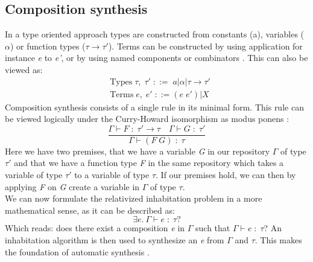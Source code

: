 \subsection{Composition synthesis}
In a type oriented approach types are constructed from constants (a), variables ($\alpha$) or function types ($\tau \to \tau'$). Terms can be constructed by using application for instance \textit{e} to \textit{e'}, or by using named components or combinators \cite{CLSPaper}. This can also be viewed as:
\begin{align*}
	&\text{Types}\; \tau,\;\tau'\; ::=\; a | \alpha | \tau \to \tau'\\
	&\text{Terms}\; e,\; e'\; ::= (e\; e') | X
\end{align*}
Composition synthesis consists of a single rule in its minimal form. This rule can be viewed logically under the Curry-Howard isomorphism as modus ponens \cite{CLSPaper}:
\begin{equation*}
	\frac{\Gamma \vdash F\; : \; \tau' \to \tau \quad \Gamma \vdash G\; : \; \tau'}{\Gamma \vdash (F\; G)\; : \; \tau}
\end{equation*}
Here we have two premises, that we have a variable \textit{G} in our repository $\Gamma$ of type $\tau'$ and that we have a function type \textit{F} in the same repository which takes a variable of type $\tau'$ to a variable of type $\tau$. If our premises hold, we can then by applying \textit{F} on \textit{G} create a variable in $\Gamma$ of type $\tau$.\\
We can now formulate the relativized inhabitation problem in a more mathematical sense, as it can be described as:
\begin{equation*}
	\exists e.\ \Gamma \vdash e\; : \; \tau?
\end{equation*}
Which reads: does there exist a composition \textit{e} in $\Gamma$ such that $\Gamma \vdash e\; : \; \tau$? An inhabitation algorithm is then used to synthesize an \textit{e} from $\Gamma$ and $\tau$. This makes the foundation of automatic synthesis \cite{CLSPaper}.

